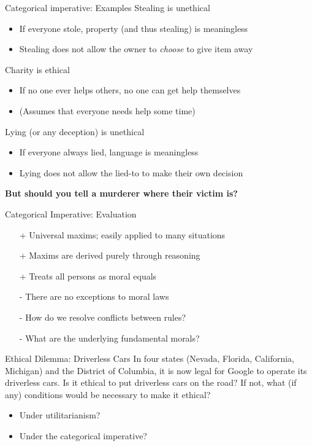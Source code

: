 \documentclass{beamer}
\begin{document}
\begin{frame}{Categorical imperative: Examples}
Stealing is unethical
\begin{itemize}
\item If everyone stole, property (and thus stealing) is meaningless
\item Stealing does not allow the owner to \emph{choose} to give item away
\end{itemize}
\medskip
\pause
Charity is ethical
\begin{itemize}
\item If no one ever helps others, no one can get help themselves
\item (Assumes that everyone needs help some time)
\end{itemize}
\medskip
\pause
Lying (or any deception) is unethical
\begin{itemize}
\item If everyone always lied, language is meaningless
\item Lying does not allow the lied-to to make their own decision
\end{itemize}
\pause
\medskip
\textbf{But should you tell a murderer where their victim is?}
\end{frame}

\begin{frame}{Categorical Imperative: Evaluation}
\begin{itemize}
\item[+] Universal maxims; easily applied to many situations
\item[+] Maxims are derived purely through reasoning
\item[+] Treats all persons as moral equals
\item[-] There are no exceptions to moral laws
\item[-] How do we resolve conflicts between rules?
\item[-] What are the underlying fundamental morals?
\end{itemize}
\end{frame}

\begin{frame}{Ethical Dilemma: Driverless Cars}
In four states (Nevada, Florida, California, Michigan) and the District of Columbia, it is now legal for Google to operate its driverless cars. Is it ethical to put driverless cars on the road? If not, what (if any) conditions would be necessary to make it ethical?
\bigskip
\begin{itemize}
\item Under utilitarianism?
\item Under the categorical imperative?
\end{itemize}
\end{frame}
\end{document}

